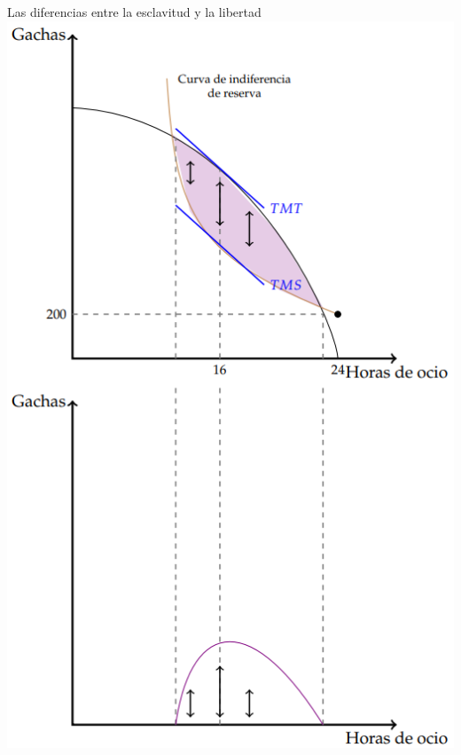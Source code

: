 \documentclass{beamer}
\begin{document}
\begin{frame}{Las diferencias entre la esclavitud y la libertad}
    \centering
    \includegraphics[scale=0.45]{../Figures/C19.11.png}
\end{frame}
\end{document}
